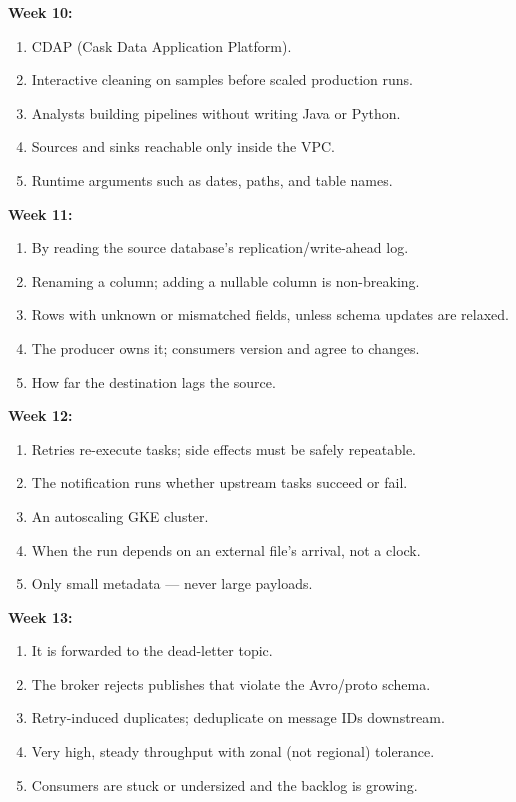 \documentclass[11pt, a4paper]{article}
\begin{document}
\textbf{Week 10:}
\begin{enumerate}[nosep, leftmargin=1.5em]
    \item CDAP (Cask Data Application Platform).
    \item Interactive cleaning on samples before scaled production runs.
    \item Analysts building pipelines without writing Java or Python.
    \item Sources and sinks reachable only inside the VPC.
    \item Runtime arguments such as dates, paths, and table names.
\end{enumerate}

\textbf{Week 11:}
\begin{enumerate}[nosep, leftmargin=1.5em]
    \item By reading the source database's replication/write-ahead log.
    \item Renaming a column; adding a nullable column is non-breaking.
    \item Rows with unknown or mismatched fields, unless schema updates are relaxed.
    \item The producer owns it; consumers version and agree to changes.
    \item How far the destination lags the source.
\end{enumerate}

\textbf{Week 12:}
\begin{enumerate}[nosep, leftmargin=1.5em]
    \item Retries re-execute tasks; side effects must be safely repeatable.
    \item The notification runs whether upstream tasks succeed or fail.
    \item An autoscaling GKE cluster.
    \item When the run depends on an external file's arrival, not a clock.
    \item Only small metadata --- never large payloads.
\end{enumerate}

\textbf{Week 13:}
\begin{enumerate}[nosep, leftmargin=1.5em]
    \item It is forwarded to the dead-letter topic.
    \item The broker rejects publishes that violate the Avro/proto schema.
    \item Retry-induced duplicates; deduplicate on message IDs downstream.
    \item Very high, steady throughput with zonal (not regional) tolerance.
    \item Consumers are stuck or undersized and the backlog is growing.
\end{enumerate}
\end{document}
